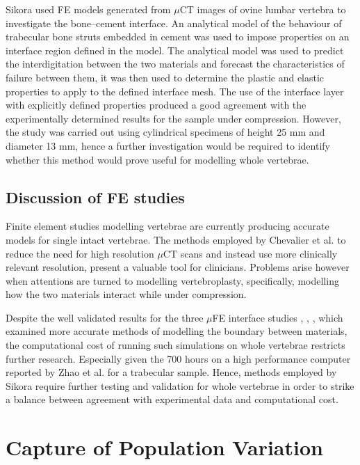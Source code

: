 Sikora \cite{Sikora2013a} used FE models generated from $\mu$CT images of ovine
lumbar
vertebra to investigate the bone--cement interface. An analytical model
of the behaviour of trabecular bone struts embedded in cement was used
to impose properties on an interface region defined in the model. The
analytical model was used to predict the interdigitation between the two
materials and forecast the characteristics of failure between them, it
was then used to determine the plastic and elastic properties to apply
to the defined interface mesh. The use of the interface layer with
explicitly defined properties produced a good agreement with the
experimentally determined results for the sample under compression.
However, the study was carried out using cylindrical specimens of height
25 mm and diameter 13 mm, hence a further investigation would be
required to identify whether this method would prove useful for
modelling whole vertebrae.

\subsection{Discussion of FE studies}\label{discussion-of-fe-studies}

Finite element studies modelling vertebrae are currently producing
accurate models for single intact vertebrae. The methods employed by
Chevalier et al. \cite{Chevalier2009} to reduce the need for high resolution
$\mu$CT
scans and instead use more clinically relevant resolution, present a
valuable tool for clinicians. Problems arise however when attentions are
turned to modelling vertebroplasty, specifically, modelling how the two
materials interact while under compression.

Despite the well validated results for the three $\mu$FE interface studies \cite{Zhao2012}, \cite{Tozzi2012}, \cite{Kinzl2012a}, which examined more accurate methods of modelling the boundary between materials, the
computational
cost of
running such simulations on whole vertebrae restricts further research.
Especially given the 700 hours on a high performance computer reported by
Zhao et al. \cite{Zhao2012} for a trabecular sample. Hence, methods employed by
Sikora \cite{Sikora2013} require further testing and validation for whole
vertebrae in order to strike a balance between agreement with
experimental data and computational cost.

\section{Capture of Population Variation}\label{principal-component-analysis-pca}

